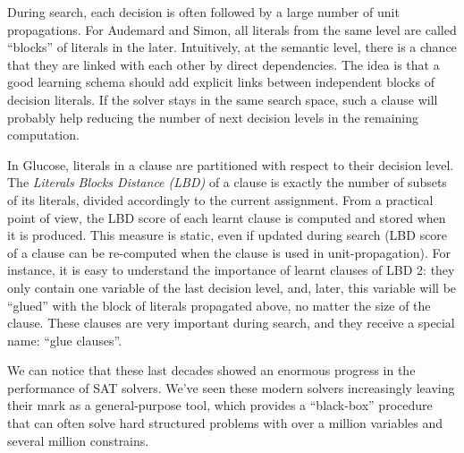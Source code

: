 During search, each decision is often followed by a large number of unit
propagations. For Audemard and Simon, all literals from the same level are
called ``blocks'' of literals in the later. Intuitively, at the semantic level,
there is a chance that they are linked with each other by direct dependencies.
The idea is that a good learning schema should add explicit links between
independent blocks of decision literals. If the solver stays in the same search
space, such a clause will probably help reducing the number of next decision
levels in the remaining computation.

In Glucose, literals in a clause are partitioned with respect to their decision
level. The \emph{Literals Blocks Distance (LBD)} of a clause is exactly the
number of subsets of its literals, divided accordingly to the current
assignment. From a practical point of view, the LBD score of each learnt clause
is computed and stored when it is produced. This measure is static, even if
updated during search (LBD score of a clause can be re-computed when the clause
is used in unit-propagation). For instance, it is easy to understand the
importance of learnt clauses of LBD 2: they only contain one variable of the
last decision level, and, later, this variable will be ``glued'' with the block
of literals propagated above, no matter the size of the clause. These clauses
are very important during search, and they receive a special name: ``glue
clauses''.

We can notice that these last decades showed an enormous progress in the
performance of SAT solvers. We've seen these modern solvers increasingly leaving
their mark as a general-purpose tool, which provides a ``black-box'' procedure
that can often solve hard structured problems with over a million variables and
several million constrains. 
